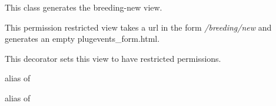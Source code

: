 \documentclass[letterpaper,10pt,english]{sphinxmanual}
\begin{document}
\begin{fulllineitems}
\label{animals:mousedb.animal.views.BreedingCreate}
This class generates the breeding-new view.

This permission restricted view takes a url in the form \emph{/breeding/new} and generates an empty plugevents\_form.html.

\begin{fulllineitems}
\label{animals:mousedb.animal.views.BreedingCreate.dispatch}
This decorator sets this view to have restricted permissions.

\end{fulllineitems}


\begin{fulllineitems}
\label{animals:mousedb.animal.views.BreedingCreate.form_class}
alias of 

\end{fulllineitems}


\begin{fulllineitems}
\label{animals:mousedb.animal.views.BreedingCreate.model}
alias of 

\end{fulllineitems}


\end{fulllineitems}

\end{document}
